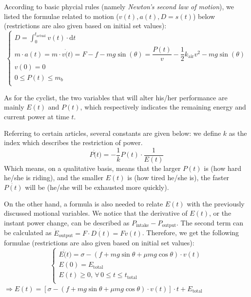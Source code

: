 \documentclass[12pt]{article}
\theoremstyle{definition}
\theoremstyle{remark}
\numberwithin{equation}{section}
\begin{document}
\begin{itemize}
			According to basic phycial rules (namely \textit{Newton's second law of motion}), we listed the formulae related to motion (\(v\left( t \right) ,a\left( t \right) ,D=s\left( t \right) \)) below (restrictions are also given based on initial set values):
			$$
			\begin{cases}
				\displaystyle
				D=\int^{t_\mathrm{actual}}_0 v(t)\cdot \mathrm{d}t\\
				m \cdot  a (t)=m \cdot v\dot(t)=F-f-mg\sin\left(\theta\right)=\dfrac{P (t)}{v}-\dfrac{1}{2} k_{\mathrm{air}} v^2-mg\sin\left(\theta\right)\\
				v(0)=0\\
				0\leq P (t)\leq m_ b\\
			\end{cases}
			$$

			As for the cyclist, the two variables that will alter his/her performance are mainly \(E(t)\) and \(P(t)\), which respectively indicates the remaining energy and current power at time \(t\).

			Referring to certain articles\cite{114514}, several constants are given below: we define $k$ as the index which describes the restriction of power.
			\[P \dot(t)=-\dfrac{1}{ k } P (t) \cdot \dfrac{1}{ E (t)}\]
			Which means, on a qualitative basis, means that the larger \(P(t)\) is (how hard he/she is riding), and the smaller \(E(t)\) is (how tired he/she is), the faster \(\dot{P(t)}\) will be (he/she will be exhausted more quickly).

			On the other hand, a formula is also needed to relate \(E(t)\) with the previously discussed motional variables. We notice that the derivative of \(E(t)\), or the instant power change, can be described as \(P_{\mathrm{intake}} - P_{\mathrm{output}}\). The second term can be calculated as \(\dot{E}_{\mathrm{output}}=F\cdot \dot{D\left( t \right)} =Fv\left( t \right) \). Therefore, we get the following formulae (restrictions are also given based on initial set values):
			$$
			\begin{cases}
				\displaystyle
				E \dot(t)=\sigma-\left(f+mg\sin\theta+\mu mg\cos \theta\right)\cdot v(t) \\
				E (0)= E _\mathrm{total} \\
				E (t)\geq0,\, \forall\,0 \leq t \leq t_\mathrm{total} \\
			\end{cases}
			$$
			\(\Rightarrow E (t)=\left[\sigma-\left(f+mg\sin \theta +\mu mg \cos \theta \right)\cdot v(t)\right]\cdot t+ E _\mathrm{total}\)


\end{itemize}
\end{document}
